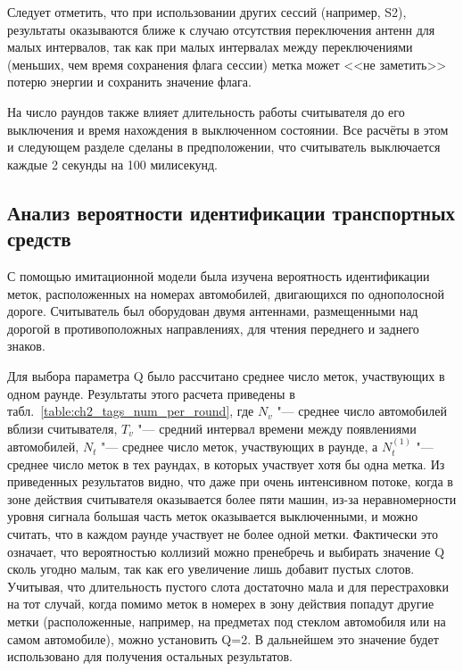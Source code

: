 Следует отметить, что при использовании других сессий (например, S2), результаты оказываются ближе к случаю отсутствия переключения антенн для малых интервалов, так как при малых интервалах между переключениями (меньших, чем время сохранения флага сессии) метка может <<не заметить>> потерю энергии и сохранить значение флага.

На число раундов также влияет длительность работы считывателя до его выключения и время нахождения в выключенном состоянии. Все расчёты в этом и следующем разделе сделаны в предположении, что считыватель выключается каждые 2 секунды на 100 милисекунд.



\subsection{Анализ вероятности идентификации транспортных средств}
С помощью имитационной модели была изучена вероятность идентификации меток, расположенных на номерах автомобилей, двигающихся по однополосной дороге. Считыватель был оборудован двумя антеннами, размещенными над дорогой в противоположных направлениях, для чтения переднего и заднего знаков.

Для выбора параметра Q было рассчитано среднее число меток, участвующих в одном раунде. Результаты этого расчета приведены в табл.~\ref{table:ch2_tags_num_per_round}, где $N_v$ "--- среднее число автомобилей вблизи считывателя, $T_v$ "--- средний интервал времени между появлениями автомобилей, $N_t$ "--- среднее число меток, участвующих в раунде, а $N_t^{(1)}$ "--- среднее число меток в тех раундах, в которых участвует хотя бы одна метка. Из приведенных результатов видно, что даже при очень интенсивном потоке, когда в зоне действия считывателя оказывается более пяти машин, из-за неравномерности уровня сигнала большая часть меток оказывается выключенными, и можно считать, что в каждом раунде участвует не более одной метки. Фактически это означает, что вероятностью коллизий можно пренебречь и выбирать значение Q сколь угодно малым, так как его увеличение лишь добавит пустых слотов. Учитывая, что длительность пустого слота достаточно мала и для перестраховки на тот случай, когда помимо меток в номерех в зону действия попадут  другие метки (расположенные, например, на предметах под стеклом автомобиля или на самом автомобиле), можно установить Q=2. В дальнейшем это значение будет использовано для получения остальных результатов.

